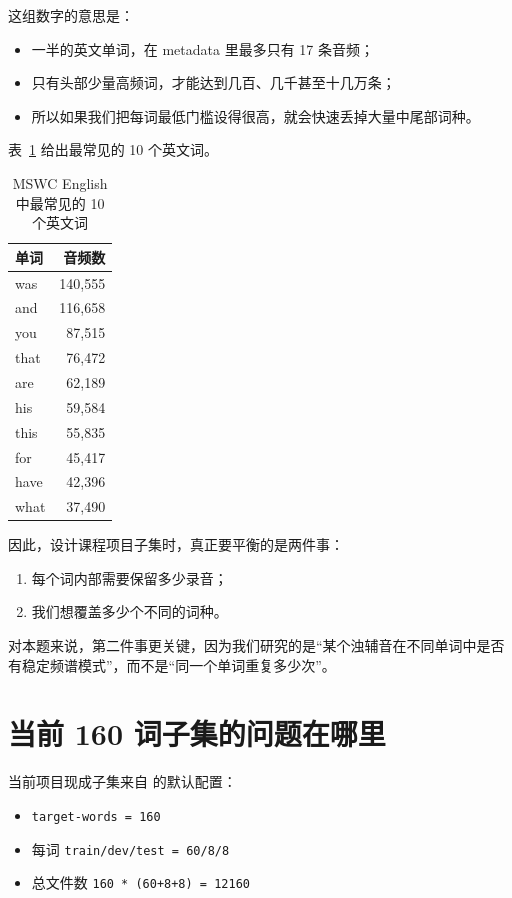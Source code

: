 \documentclass[11pt,a4paper]{ctexart}
\begin{document}
这组数字的意思是：
\begin{itemize}[nosep]
    \item 一半的英文单词，在 metadata 里最多只有 17 条音频；
    \item 只有头部少量高频词，才能达到几百、几千甚至十几万条；
    \item 所以如果我们把每词最低门槛设得很高，就会快速丢掉大量中尾部词种。
\end{itemize}

表~\ref{tab:topwords} 给出最常见的 10 个英文词。

\begin{table}[H]
    \centering
    \caption{MSWC English 中最常见的 10 个英文词}
    \label{tab:topwords}
    \begin{tabular}{lr}
        \toprule
        单词 & 音频数 \\
        \midrule
        was & 140,555 \\
        and & 116,658 \\
        you & 87,515 \\
        that & 76,472 \\
        are & 62,189 \\
        his & 59,584 \\
        this & 55,835 \\
        for & 45,417 \\
        have & 42,396 \\
        what & 37,490 \\
        \bottomrule
    \end{tabular}
\end{table}

因此，设计课程项目子集时，真正要平衡的是两件事：
\begin{enumerate}[nosep]
    \item 每个词内部需要保留多少录音；
    \item 我们想覆盖多少个不同的词种。
\end{enumerate}

对本题来说，第二件事更关键，因为我们研究的是“某个浊辅音在不同单词中是否有稳定频谱模式”，而不是“同一个单词重复多少次”。

\section{当前 160 词子集的问题在哪里}

当前项目现成子集来自  的默认配置：
\begin{itemize}[nosep]
    \item \texttt{target-words = 160}
    \item 每词 \texttt{train/dev/test = 60/8/8}
    \item 总文件数 \texttt{160 * (60+8+8) = 12160}
\end{itemize}
\end{document}
